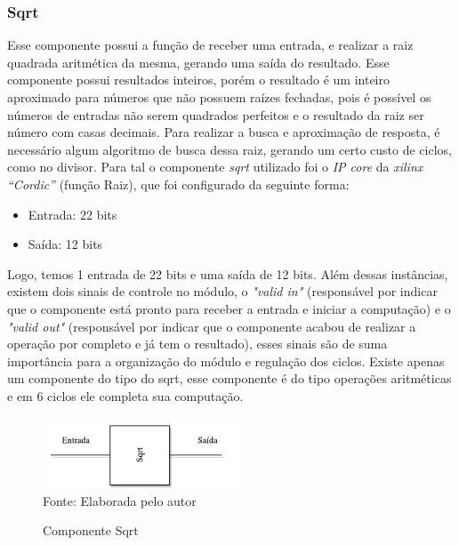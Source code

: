\subsubsection{Sqrt}
Esse componente possui a função de receber uma entrada, e realizar a raiz quadrada aritmética da mesma, gerando uma saída do resultado. Esse componente possui resultados inteiros, porém o resultado é um inteiro aproximado para números que não possuem raízes fechadas, pois é possível os números de entradas não serem quadrados perfeitos e o resultado da raiz ser número com casas decimais. Para realizar a busca e aproximação de resposta, é necessário algum algoritmo de busca dessa raiz, gerando um certo custo de ciclos, como no divisor. Para tal o componente \textit{sqrt} utilizado foi o \textit{IP core} da \textit{xilinx “Cordic”} (função Raiz), que foi configurado da seguinte forma: 
\begin{itemize}
	\item Entrada: 22 bits
	\item Saída: 12 bits
\end{itemize}
Logo, temos 1 entrada de 22 bits e uma saída de 12 bits. Além dessas instâncias, existem dois sinais de controle no módulo, o \textit{"valid in"} (responsável por indicar que o componente está pronto para receber a entrada e iniciar a computação) e o \textit{"valid out"} (responsável por indicar que o componente acabou de realizar a operação por completo e já tem o resultado), esses sinais são de suma importância para a organização do módulo e regulação dos ciclos. Existe apenas um componente do tipo do sqrt, esse componente é do tipo operações aritméticas e em 6 ciclos ele completa sua computação.

\begin{figure}[H]
	\centering
		\caption{Componente Sqrt}
	\includegraphics[width=6cm]{figures/sqrt.pdf}\\


		{Fonte: Elaborada pelo autor}
	\label{Sqrt}
\end{figure}

